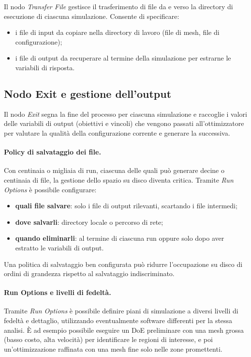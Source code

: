 Il nodo \textit{Transfer File} gestisce il trasferimento di file
da e verso la directory di esecuzione di ciascuna simulazione.
Consente di specificare:
\begin{itemize}
    \item i file di input da copiare nella directory di lavoro (file
    di mesh, file di configurazione);
    \item i file di output da recuperare al termine della simulazione
    per estrarne le variabili di risposta.
\end{itemize}

\subsection{Nodo Exit e gestione dell'output}

Il nodo \textit{Exit} segna la fine del processo per ciascuna
simulazione e raccoglie i valori delle variabili di output (obiettivi
e vincoli) che vengono passati all'ottimizzatore per valutare la qualità
della configurazione corrente e generare la successiva.

\paragraph{Policy di salvataggio dei file.}
Con centinaia o migliaia di run, ciascuna delle quali può generare
decine o centinaia di file, la gestione dello spazio su disco diventa
critica.
Tramite \textit{Run Options} è possibile configurare:
\begin{itemize}
    \item \textbf{quali file salvare}: solo i file di output rilevanti,
    scartando i file intermedi;
    \item \textbf{dove salvarli}: directory locale o percorso di rete;
    \item \textbf{quando eliminarli}: al termine di ciascuna run oppure
    solo dopo aver estratto le variabili di output.
\end{itemize}
Una politica di salvataggio ben configurata può ridurre l'occupazione
su disco di ordini di grandezza rispetto al salvataggio indiscriminato.

\paragraph{Run Options e livelli di fedeltà.}
Tramite \textit{Run Options} è possibile definire piani di simulazione
a diversi livelli di fedeltà e dettaglio, utilizzando eventualmente
software differenti per la stessa analisi.
È ad esempio possibile eseguire un DoE preliminare con una mesh grossa
(basso costo, alta velocità) per identificare le regioni di interesse,
e poi un'ottimizzazione raffinata con una mesh fine solo nelle zone
promettenti.

